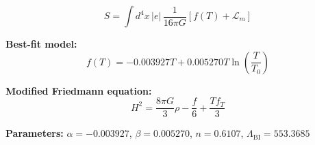 
\begin{equation}
  S = \int d^4x \, |e| \, \frac{1}{16\pi G} \left[ f(T) + \mathcal{L}_m \right]
\end{equation}

\textbf{Best-fit model:}
\begin{equation}
  f(T) = -0.003927 T + 0.005270 T \ln\!\left(\frac{T}{T_0}\right)
\end{equation}

\textbf{Modified Friedmann equation:}
\begin{equation}
  H^2 = \frac{8\pi G}{3} \rho - \frac{f}{6} + \frac{T f_T}{3}
\end{equation}

\textbf{Parameters:}
$\alpha = -0.003927$, \quad
$\beta = 0.005270$, \quad
$n = 0.6107$, \quad
$\Lambda_{\text{BI}} = 553.3685$